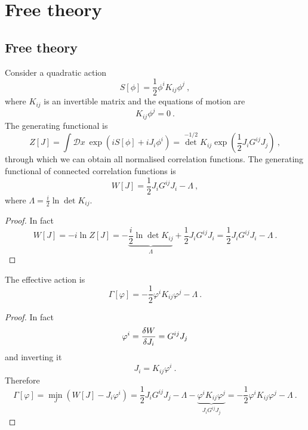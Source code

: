\part{Free theory}

\chapter{Free theory}   

    Consider a quadratic action 
    \begin{equation*}
        S[\phi] = \frac{1}{2} \phi^i K_{ij} \phi^j ~,
    \end{equation*}
    where $K_{ij}$ is an invertible matrix and the equations of motion are 
    \begin{equation*}
        K_{ij} \phi^j = 0 ~.
    \end{equation*}
    The generating functional is 
    \begin{equation*}
        Z[J] = \int \mathcal D x ~ \exp(i S[\phi] + i J_i \phi^i) = \det^{-1/2} K_{ij} \exp(\frac{1}{2} J_i G^{ij} J_j) ~,
    \end{equation*}
    through which we can obtain all normalised correlation functions. 
    The generating functional of connected correlation functions is 
    \begin{equation*}
        W[J] = \frac{1}{2} J_i G^{ij} J_i - \Lambda ~,
    \end{equation*} 
    where $\Lambda = \frac{i}{2} \ln \det K_{ij}$.
    \begin{proof}
        In fact 
        \begin{equation*}
            W[J] = - i \ln Z[J] = - \underbrace{\frac{i}{2} \ln \det K_{ij}}_\Lambda + \frac{1}{2}  J_i G^{ij} J_i = \frac{1}{2} J_i G^{ij} J_i - \Lambda  ~.
        \end{equation*}
    \end{proof}
    The effective action is 
    \begin{equation*}
        \Gamma[\varphi] = - \frac{1}{2} \varphi^i K_{ij} \varphi^j - \Lambda ~.
    \end{equation*}
    \begin{proof}
        In fact 
        \begin{equation*}
            \varphi^i = \frac{\delta W}{\delta J_i} = G^{ij} J_j
        \end{equation*}
        and inverting it 
        \begin{equation*}
            J_i = K_{ij} \varphi^i ~.
        \end{equation*}
        Therefore
        \begin{equation*}
            \Gamma[\varphi] = \min_J (W[J] - J_i \varphi^i) = \frac{1}{2} J_i G^{ij} J_j - \Lambda - \underbrace{\varphi^i K_{ij} \varphi^j}_{J_i G^{ij} J_j} = - \frac{1}{2} \varphi^i K_{ij} \varphi^j - \Lambda ~.
        \end{equation*}
    \end{proof}

